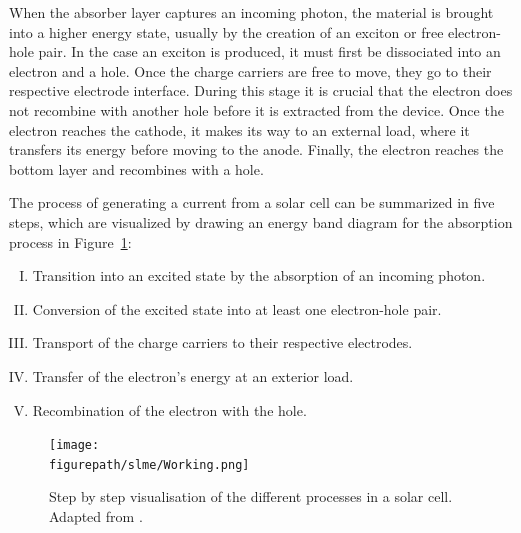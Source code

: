 \begin{refsection}
When the absorber layer captures an incoming photon, the material is brought 
into a higher energy state, usually by the creation of an exciton or free 
electron-hole pair. In the case an exciton is produced, it must first be 
dissociated into an electron and a hole. Once the charge carriers are free to 
move, they go to their respective electrode interface. During this stage it is 
crucial that the electron does not recombine with another hole before it is 
extracted from the device. Once the electron reaches the cathode, it makes its 
way to an external load, where it transfers its energy before moving to the 
anode. Finally, the electron reaches the bottom layer and recombines with a 
hole. 

\pagebreak[4]
The process of generating a current from a solar cell can be summarized in 
five steps, which are visualized by drawing an energy band diagram for the 
absorption process in Figure~\ref{slme:fig-working}: 
 
\vspace{0.25in} 
\begin{enumerate}[I.]  
 
\item Transition into an excited state by the absorption of an incoming 
photon.  
 
\item Conversion of the excited state into at least one electron-hole pair. 
 
\item Transport of the charge carriers to their respective electrodes. 
 
\item Transfer of the electron's energy at an exterior load. 
 
\item Recombination of the electron with the hole. 
 
\end{enumerate} 
\vspace{0.50in} 
 
\begin{figure}[ht]  
\centering 
\texttt{[image: \\figurepath/slme/Working.png]} 
\caption{\label{slme:fig-working} Step by step visualisation of the different 
processes in a solar cell. Adapted from \cite{Smestad2002}.} 
\end{figure} 
 

\end{refsection}
